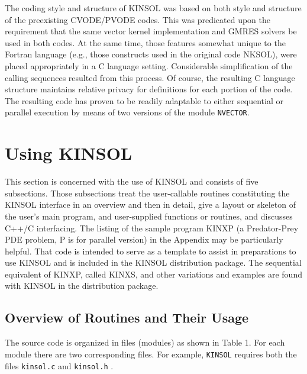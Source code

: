 The coding style and structure of KINSOL was based on both style and structure
of the preexisting CVODE/PVODE codes. This was predicated upon the requirement
that the same vector kernel implementation and GMRES solvers be used in both 
codes. At the same time, those features somewhat unique to the Fortran language
(e.g., those constructs used in the original code NKSOL), were placed 
appropriately in a C language setting. Considerable simplification of the 
calling sequences resulted from this process. Of course, the resulting C 
language structure maintains relative privacy for definitions for each portion
of the code. The resulting code has proven to be readily adaptable to either
sequential or parallel execution by means of two versions of the module 
{\tt NVECTOR}.

\section{Using KINSOL}

This section is concerned with the use of KINSOL and consists of five
subsections. Those subsections treat the user-callable routines constituting 
the KINSOL interface in an overview and then in detail, give a layout or 
skeleton of the user's main program, and user-supplied functions or routines,
and discusses  C++/C interfacing. The listing of the sample program KINXP 
(a Predator-Prey PDE problem, P is for parallel version) in the 
Appendix may be particularly helpful. That code is intended to serve as a 
template to assist in preparations to use KINSOL and is included in the 
KINSOL distribution package. The sequential equivalent of KINXP, called KINXS, and
other variations and examples are found with KINSOL in the distribution
package.


\subsection{Overview of Routines and Their Usage}

The source code is organized in files (modules) as shown in Table 1. For each 
module there are two corresponding files. For example, {\tt KINSOL} requires 
both the files {\tt kinsol.c} and {\tt kinsol.h} .


